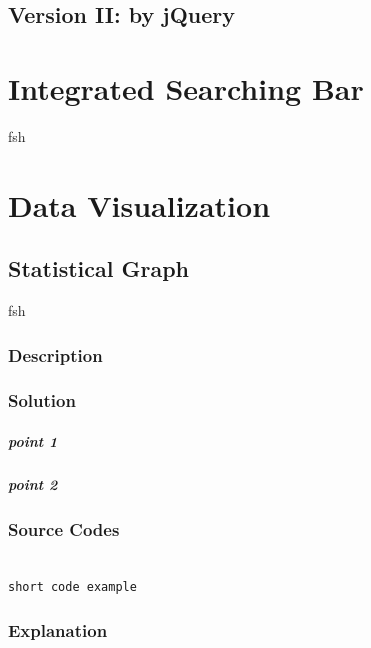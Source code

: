 \documentclass{book}
\begin{document}
\section{Version II: by jQuery}



\chapter {Integrated Searching Bar}

fsh


\chapter {Data Visualization}


\section {Statistical Graph}

fsh

\subsection{Description}

\subsection{Solution}

\paragraph{point 1}

\paragraph{point 2}

\subsection{Source Codes}

\begin{minipage}[r]{15em}
\begin{verbatim}

short code example

\end{verbatim}
\end{minipage}

\subsection{Explanation}
\end{document}
